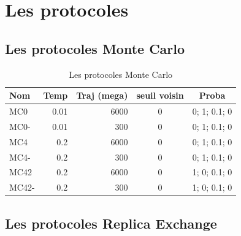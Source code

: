\documentclass[a4paper,12pt]{article}
\begin{document}
   \section{Les protocoles} 



   \subsection{Les protocoles Monte Carlo} 
    
    \begin{table}[!htbp]
      \centering

      \begin{tabular}{|l|r|r|c|c|}

        \hline
        Nom & Temp & Traj (mega)& seuil voisin  & Proba \\
        \hline
        MC0   & 0.01  &  6000 & 0 & 0; 1; 0.1; 0   \\  
        MC0-  & 0.01  &   300 & 0 & 0; 1; 0.1; 0   \\  
        MC4   & 0.2   &  6000 & 0 & 0; 1; 0.1; 0   \\          
        MC4-  & 0.2   &   300 & 0 & 0; 1; 0.1; 0   \\ 
        MC42  & 0.2   &  6000 & 0 & 1; 0; 0.1; 0   \\        
        MC42- & 0.2   &   300 & 0 & 1; 0; 0.1; 0   \\   \hline                   

       
      \end{tabular}      
      \caption{Les protocoles Monte Carlo}
      \label{tab_protoMC}      
    \end{table}

   \subsection{Les protocoles Replica Exchange} 
    
\end{document}
